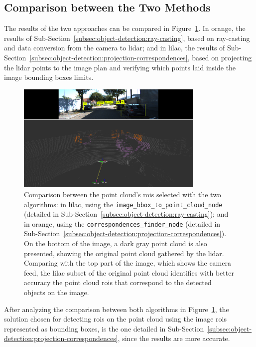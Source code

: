 \subsection{Comparison between the Two Methods}
The results of the two approaches can be compared in Figure~\ref{fig:rois-matching-comparison}. In orange, the results of Sub-Section~\ref{subsec:object-detection:ray-casting}, based on ray-casting and data conversion from the camera to \ac{lidar}; and in lilac, the results of Sub-Section~\ref{subsec:object-detection:projection-correspondences}, based on projecting the \ac{lidar} points to the image plan and verifying which points laid inside the image bounding boxes limits.


\begin{figure}[!ht]
	\centering
	\includegraphics[width=0.8\textwidth]{img/image-object-to-point-cloud/rois-comparison.png}
	\caption[Comparison between the $3D \rightarrow 2D$ and frustum filtering correspondences algorithm results.]{Comparison between the point cloud's \acp{roi} selected with the two algorithms: in lilac, using the \texttt{image\_bbox\_to\_point\_cloud\_node} (detailed in Sub-Section~\ref{subsec:object-detection:ray-casting}); and in orange, using the \texttt{correspondences\_finder\_node} (detailed in Sub-Section~\ref{subsec:object-detection:projection-correspondences}). On the bottom of the image, a dark gray point cloud is also presented, showing the original point cloud gathered by the \ac{lidar}. Comparing with the top part of the image, which shows the camera feed, the lilac subset of the original point cloud identifies with better accuracy the point cloud \acp{roi} that correspond to the detected objects on the image.}
	\label{fig:rois-matching-comparison}
\end{figure}

After analyzing the comparison between both algorithms in Figure~\ref{fig:rois-matching-comparison}, the solution chosen for detecting \acp{roi} on the point cloud using the image \acp{roi} represented as bounding boxes, is the one detailed in Sub-Section~\ref{subsec:object-detection:projection-correspondences}, since the results are more accurate.


